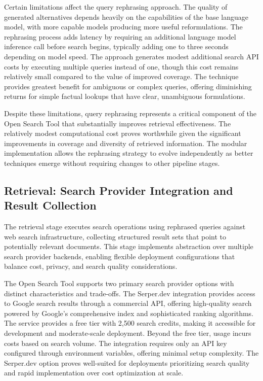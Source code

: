 Certain limitations affect the query rephrasing approach. The quality of generated alternatives depends heavily on the capabilities of the base language model, with more capable models producing more useful reformulations. The rephrasing process adds latency by requiring an additional language model inference call before search begins, typically adding one to three seconds depending on model speed. The approach generates modest additional search API costs by executing multiple queries instead of one, though this cost remains relatively small compared to the value of improved coverage. The technique provides greatest benefit for ambiguous or complex queries, offering diminishing returns for simple factual lookups that have clear, unambiguous formulations.

Despite these limitations, query rephrasing represents a critical component of the Open Search Tool that substantially improves retrieval effectiveness. The relatively modest computational cost proves worthwhile given the significant improvements in coverage and diversity of retrieved information. The modular implementation allows the rephrasing strategy to evolve independently as better techniques emerge without requiring changes to other pipeline stages.

\subsection{Retrieval: Search Provider Integration and Result Collection}

The retrieval stage executes search operations using rephrased queries against web search infrastructure, collecting structured result sets that point to potentially relevant documents. This stage implements abstraction over multiple search provider backends, enabling flexible deployment configurations that balance cost, privacy, and search quality considerations.

The Open Search Tool supports two primary search provider options with distinct characteristics and trade-offs. The Serper.dev integration provides access to Google search results through a commercial API, offering high-quality search powered by Google's comprehensive index and sophisticated ranking algorithms. The service provides a free tier with 2,500 search credits, making it accessible for development and moderate-scale deployment. Beyond the free tier, usage incurs costs based on search volume. The integration requires only an API key configured through environment variables, offering minimal setup complexity. The Serper.dev option proves well-suited for deployments prioritizing search quality and rapid implementation over cost optimization at scale.

